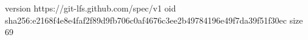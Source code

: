 version https://git-lfs.github.com/spec/v1
oid sha256:e2168f4e8e4faf2f89d9fb706c0af4676c3ee2b49784196e49f7da39f51f30ec
size 69
